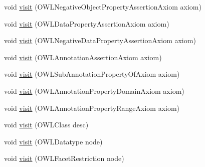 \begin{DoxyCompactItemize}
\item 
void \hyperlink{classorg_1_1coode_1_1owlapi_1_1rdf_1_1model_1_1_abstract_translator_3_01_n_o_d_e_00_01_r_e_s_o_ubc597564c2cb8c8d2b0139cb32f3f91c_a70f4203dfd5cf214dff8c93d96c3c8b9}{visit} (O\-W\-L\-Negative\-Object\-Property\-Assertion\-Axiom axiom)
\item 
void \hyperlink{classorg_1_1coode_1_1owlapi_1_1rdf_1_1model_1_1_abstract_translator_3_01_n_o_d_e_00_01_r_e_s_o_ubc597564c2cb8c8d2b0139cb32f3f91c_a46699ff463c6936c67e9dd55f308dc51}{visit} (O\-W\-L\-Data\-Property\-Assertion\-Axiom axiom)
\item 
void \hyperlink{classorg_1_1coode_1_1owlapi_1_1rdf_1_1model_1_1_abstract_translator_3_01_n_o_d_e_00_01_r_e_s_o_ubc597564c2cb8c8d2b0139cb32f3f91c_a643caa09dfbc6339d3f03e0bbacdd59d}{visit} (O\-W\-L\-Negative\-Data\-Property\-Assertion\-Axiom axiom)
\item 
void \hyperlink{classorg_1_1coode_1_1owlapi_1_1rdf_1_1model_1_1_abstract_translator_3_01_n_o_d_e_00_01_r_e_s_o_ubc597564c2cb8c8d2b0139cb32f3f91c_a9d31571fb96df0f4fff369a72a76070e}{visit} (O\-W\-L\-Annotation\-Assertion\-Axiom axiom)
\item 
void \hyperlink{classorg_1_1coode_1_1owlapi_1_1rdf_1_1model_1_1_abstract_translator_3_01_n_o_d_e_00_01_r_e_s_o_ubc597564c2cb8c8d2b0139cb32f3f91c_ad1db21a99cd27c2c41bd5f9ad8f02471}{visit} (O\-W\-L\-Sub\-Annotation\-Property\-Of\-Axiom axiom)
\item 
void \hyperlink{classorg_1_1coode_1_1owlapi_1_1rdf_1_1model_1_1_abstract_translator_3_01_n_o_d_e_00_01_r_e_s_o_ubc597564c2cb8c8d2b0139cb32f3f91c_acd3677c56c9b427a1a07ba14141aed84}{visit} (O\-W\-L\-Annotation\-Property\-Domain\-Axiom axiom)
\item 
void \hyperlink{classorg_1_1coode_1_1owlapi_1_1rdf_1_1model_1_1_abstract_translator_3_01_n_o_d_e_00_01_r_e_s_o_ubc597564c2cb8c8d2b0139cb32f3f91c_a8ace8052fa1d0a337a789256557e40dd}{visit} (O\-W\-L\-Annotation\-Property\-Range\-Axiom axiom)
\item 
void \hyperlink{classorg_1_1coode_1_1owlapi_1_1rdf_1_1model_1_1_abstract_translator_3_01_n_o_d_e_00_01_r_e_s_o_ubc597564c2cb8c8d2b0139cb32f3f91c_aa6579daddd54c01c04c756ffb57f8fc0}{visit} (O\-W\-L\-Class desc)
\item 
void \hyperlink{classorg_1_1coode_1_1owlapi_1_1rdf_1_1model_1_1_abstract_translator_3_01_n_o_d_e_00_01_r_e_s_o_ubc597564c2cb8c8d2b0139cb32f3f91c_a8aafc0d23fe4e25f9905b5ad4f88d820}{visit} (O\-W\-L\-Datatype node)
\item 
void \hyperlink{classorg_1_1coode_1_1owlapi_1_1rdf_1_1model_1_1_abstract_translator_3_01_n_o_d_e_00_01_r_e_s_o_ubc597564c2cb8c8d2b0139cb32f3f91c_a7de46500cb0d3e105d6881cbef04f779}{visit} (O\-W\-L\-Facet\-Restriction node)

\end{DoxyCompactItemize}

